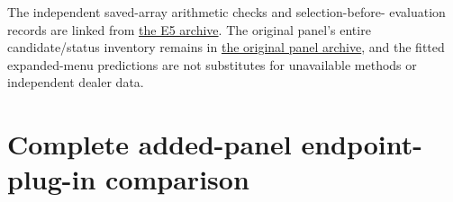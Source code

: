 \documentclass[11pt,a4paper]{article}
\begin{document}
The independent saved-array arithmetic checks and selection-before-
evaluation records are linked from \href{https://github.com/ByronLi0207/financial-mathematics-paper-20261020/blob/revision-v7-final/results/supervisor-20261023/e5/README.md}{the E5 archive}. The original panel's entire candidate/status inventory remains in
\href{https://github.com/ByronLi0207/financial-mathematics-paper-20261020/blob/revision-v7-final/results/revision-20261023/round2/panel/summary.csv}{the original panel archive},
and the fitted expanded-menu predictions are not substitutes for unavailable
methods or independent dealer data.\section{Complete added-panel endpoint-plug-in comparison}\label{sup:panel-levy}
\end{document}
